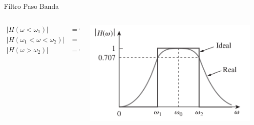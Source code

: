 \documentclass[xcolor={usenames,svgnames,dvipsnames}]{beamer}
\begin{document}
\begin{frame}[label={sec:orgf1ceb69}]{Filtro Paso Banda}
\begin{columns}
\begin{column}{0.3\columnwidth}
\begin{align*}
  |H(\omega < \omega_1)| &= 0\\
  |H(\omega_1 < \omega < \omega_2)| &= 1\\
  |H(\omega > \omega_2)| &= 0
\end{align*}
\end{column}

\begin{column}{0.7\columnwidth}
\begin{center}
\includegraphics[width=.9\linewidth]{figs/Filtro_PasoBanda.pdf}
\end{center}
\end{column}
\end{columns}
\end{frame}
\end{document}
